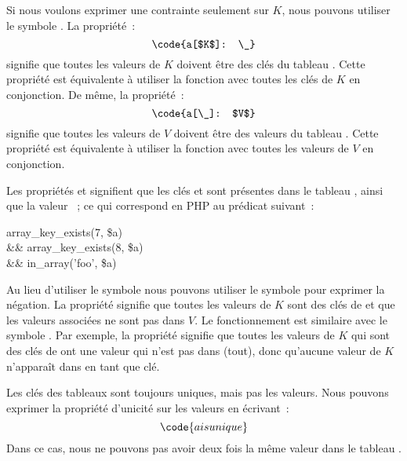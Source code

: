 Si nous voulons exprimer une contrainte seulement sur $K$, nous pouvons utiliser
le symbole \code{\_}. La propriété~:
%
$$\code{a[$K$]: \_}$$
%
signifie que toutes les valeurs de $K$ doivent être des clés du tableau
. Cette propriété est équivalente à utiliser la fonction
 avec toutes les clés de $K$ en conjonction.  De même,
la propriété~:
%
$$\code{a[\_]: $V$}$$
%
signifie que toutes les valeurs de $V$ doivent être des valeurs du tableau
. Cette propriété est équivalente à utiliser la fonction
 avec toutes les valeurs de $V$ en conjonction.

\begin{example}

Les propriétés  et  signifient que les clés
 et  sont présentes dans le tableau , ainsi que la
valeur ~; ce qui correspond en PHP au prédicat suivant~:
%
\begin{pre}
   array\_key\_exists(7, \$a) \\
\&\& array\_key\_exists(8, \$a) \\
\&\& in\_array('foo', \$a)
\end{pre}

\end{example}

Au lieu d'utiliser le symbole \code{:} nous pouvons utiliser le symbole
\code{!:} pour exprimer la négation. La propriété  signifie
que toutes les valeurs de $K$ sont des clés de  et que les valeurs
associées ne sont pas dans $V$. Le fonctionnement est similaire avec le symbole
\code{\_}.  Par exemple, la propriété  signifie que toutes les
valeurs de $K$ qui sont des clés de  ont une valeur qui n'est pas dans
\code{\_} (tout), donc qu'aucune valeur de $K$ n'apparaît dans  en tant
que clé.

Les clés des tableaux sont toujours uniques, mais pas les valeurs. Nous pouvons
exprimer la propriété d'unicité sur les valeurs en écrivant~:
%
$$\code{a is unique}$$
%
Dans ce cas, nous ne pouvons pas avoir deux fois la même valeur dans le tableau
.

